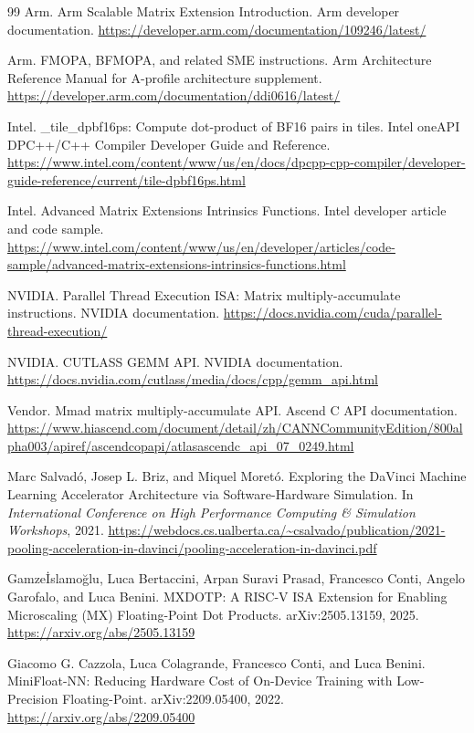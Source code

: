 \documentclass[UTF8,11pt,a4paper]{ctexart}
\begin{document}
\begin{thebibliography}{99}
Arm.
\newblock Arm Scalable Matrix Extension Introduction.
\newblock Arm developer documentation.
\newblock \url{https://developer.arm.com/documentation/109246/latest/}

Arm.
\newblock FMOPA, BFMOPA, and related SME instructions.
\newblock Arm Architecture Reference Manual for A-profile architecture supplement.
\newblock \url{https://developer.arm.com/documentation/ddi0616/latest/}

Intel.
\newblock \_tile\_dpbf16ps: Compute dot-product of BF16 pairs in tiles.
\newblock Intel oneAPI DPC++/C++ Compiler Developer Guide and Reference.
\newblock \url{https://www.intel.com/content/www/us/en/docs/dpcpp-cpp-compiler/developer-guide-reference/current/tile-dpbf16ps.html}

Intel.
\newblock Advanced Matrix Extensions Intrinsics Functions.
\newblock Intel developer article and code sample.
\newblock \url{https://www.intel.com/content/www/us/en/developer/articles/code-sample/advanced-matrix-extensions-intrinsics-functions.html}

NVIDIA.
\newblock Parallel Thread Execution ISA: Matrix multiply-accumulate instructions.
\newblock NVIDIA documentation.
\newblock \url{https://docs.nvidia.com/cuda/parallel-thread-execution/}

NVIDIA.
\newblock CUTLASS GEMM API.
\newblock NVIDIA documentation.
\newblock \url{https://docs.nvidia.com/cutlass/media/docs/cpp/gemm_api.html}

Vendor.
\newblock Mmad matrix multiply-accumulate API.
\newblock Ascend C API documentation.
\newblock \url{https://www.hiascend.com/document/detail/zh/CANNCommunityEdition/800alpha003/apiref/ascendcopapi/atlasascendc_api_07_0249.html}

Marc Salvad\'o, Josep L. Briz, and Miquel Moret\'o.
\newblock Exploring the DaVinci Machine Learning Accelerator Architecture via Software-Hardware Simulation.
\newblock In \emph{International Conference on High Performance Computing \& Simulation Workshops}, 2021.
\newblock \url{https://webdocs.cs.ualberta.ca/~csalvado/publication/2021-pooling-acceleration-in-davinci/pooling-acceleration-in-davinci.pdf}

Gamze\. Islamo\u{g}lu, Luca Bertaccini, Arpan Suravi Prasad, Francesco Conti, Angelo Garofalo, and Luca Benini.
\newblock MXDOTP: A RISC-V ISA Extension for Enabling Microscaling (MX) Floating-Point Dot Products.
\newblock arXiv:2505.13159, 2025.
\newblock \url{https://arxiv.org/abs/2505.13159}

Giacomo G. Cazzola, Luca Colagrande, Francesco Conti, and Luca Benini.
\newblock MiniFloat-NN: Reducing Hardware Cost of On-Device Training with Low-Precision Floating-Point.
\newblock arXiv:2209.05400, 2022.
\newblock \url{https://arxiv.org/abs/2209.05400}

\end{thebibliography}
\end{document}
